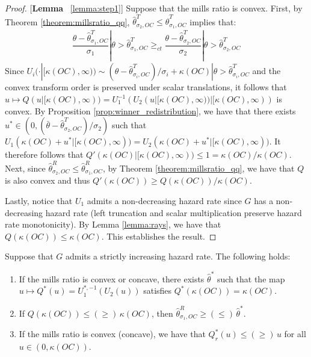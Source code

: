 \begin{proof}{[\textbf{Lemma} ~\ref{lemma:step1}]} Suppose that the mills ratio is convex. First, by Theorem \ref{theorem:millsratio_qq}, $\hat{\theta}_{\sigma_2,OC}^T \leq \hat{\theta}^T_{\sigma_1,OC}$ implies that:
\begin{align*}
    \dfrac{\theta-\hat{\theta}^T_{\sigma_1,OC}}{\sigma_1}|\theta>\hat{\theta}^T_{\sigma_1,OC} \geq_{ct} \dfrac{\theta-\hat{\theta}^T_{\sigma_2,OC}}{\sigma_2}|\theta>\hat{\theta}^T_{\sigma_2,OC} 
\end{align*}
Since $U_i(\cdot|[\kappa(OC),\infty))\sim (\theta-\hat{\theta}^T_{\sigma_i,OC})/\sigma_i + \kappa(OC)|\theta>\hat{\theta}^T_{\sigma_i,OC}$ and the convex transform order is preserved under scalar translations, it follows that $u\mapsto Q(u|[\kappa(OC),\infty))= U_1^{-1}(U_2(u|[\kappa(OC),\infty))|[\kappa(OC),\infty))$ is convex. By Proposition \ref{prop:winner_redistribution}, we have that there exists $u^*\in(0,(\bar{\theta} - \hat{\theta}^T_{\sigma_2,OC})/\sigma_2)$ such that $U_1(\kappa(OC)+u^*|[\kappa(OC),\infty)) = U_2(\kappa(OC)+u^*|[\kappa(OC),\infty))$. It therefore follows that $Q'(\kappa(OC)|[\kappa(OC),\infty))\leq 1 = \kappa(OC)/\kappa(OC)$. Next, since $\hat{\theta}_{\sigma_2,OC}^R \leq \hat{\theta}^R_{\sigma_1,OC}$, by Theorem \ref{theorem:millsratio_qq}, we have that $Q$ is also convex and thus $Q'(\kappa(OC))\geq Q(\kappa(OC))/\kappa(OC)$. 

\noindent Lastly, notice that $U_1$ admits a non-decreasing hazard rate since $G$ has a non-decreasing hazard rate (left truncation and scalar multiplication preserve hazard rate monotonicity). By Lemma \ref{lemma:rays}, we have that $Q(\kappa(OC))\leq \kappa(OC)$. This establishes the result. 
\end{proof}

\begin{lemma}\label{lemma:step2and3}
Suppose that $G$ admits a strictly increasing hazard rate. The following holds:
\vspace{-5pt}
\begin{enumerate}[label=(\arabic*),ref=\thelemma(\arabic*)]
   \item If the mills ratio is convex or concave, there exists $\hat{\theta}^*$ such that the map $u\mapsto Q^*(u) = U_1^{*,-1}(U_2(u))$ satisfies $Q^*(\kappa(OC)) = \kappa(OC)$. 
   \item If $Q(\kappa(OC))\leq (\geq)\, \kappa(OC)$, then $\hat{\theta}^{R}_{\sigma_1,OC}\geq (\leq)\, \hat{\theta}^*$. 
   \item If the mills ratio is convex (concave), we have that $Q^*_r(u)\leq (\geq)\, u$ for all $u\in(0,\kappa(OC))$. 
\end{enumerate}
\end{lemma}

